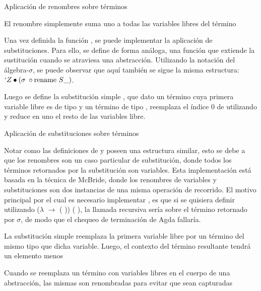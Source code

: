 \begin{codigo}
	Aplicación de renombres sobre términos
\end{codigo}

\begin{example}
	El renombre  simplemente suma uno a todas las variables libres del término
\end{example}

Una vez definida la función , se puede implementar la aplicación de substituciones.
Para ello, se define de forma análoga, una función  que extiende la sustitución cuando se atraviesa una abstracción.
Utilizando la notación del álgebra-$\sigma$, se puede observar que aquí también se sigue la misma estructura: $`Z \bullet (\sigma \; \circ \text{rename } S\_)$.

Luego se define la substitución simple \func{$\_[\_]$}, que dato un término  cuya primera variable libre es de tipo  y un término  de tipo , reemplaza el índice 0 de  utilizando  y reduce en uno el resto de las variables libre.

\begin{codigo}
	Aplicación de substituciones sobre términos
\end{codigo}

Notar como las definiciones de  y  poseen una estructura similar, esto se debe a que los renombres son un caso particular de substitución, donde todos los términos retornados por la substitución son variables.
Esta implementación está basada en la técnica de McBride\cite{ren-sub}, donde los renombres de variables y substituciones son dos instancias de una misma operación de recorrido.
El motivo principal por el cual es necesario implementar , es que si se quisiera definir  utilizando  ($\lambda$  $\rightarrow$  ( )) (\bound{$\sigma$} ), la llamada recursiva sería sobre el término retornado por $\sigma$, de modo que el chequeo de terminación de Agda fallaría.

\begin{example}
	La substitución simple reemplaza la primera variable libre por un término del mismo tipo que dicha variable.
	Luego, el contexto del término resultante tendrá un elemento menos
\end{example}
\begin{example}
	Cuando se reemplaza un término con variables libres en el cuerpo de una abstracción, las mismas son renombradas para evitar que sean capturadas
\end{example}

